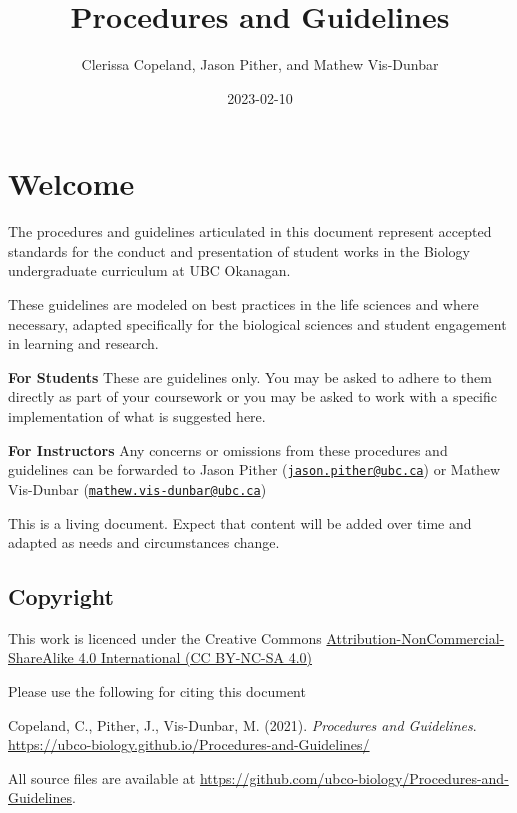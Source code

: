 \documentclass[
]{book}
\title{Procedures and Guidelines}
\author{Clerissa Copeland, Jason Pither, and Mathew Vis-Dunbar}
\date{2023-02-10}
\begin{document}
\maketitle

{
\setcounter{tocdepth}{1}
\tableofcontents
}
\hypertarget{welcome}{%
\chapter*{Welcome}\label{welcome}}

The procedures and guidelines articulated in this document represent accepted standards for the conduct and presentation of student works in the Biology undergraduate curriculum at UBC Okanagan.

These guidelines are modeled on best practices in the life sciences and where necessary, adapted specifically for the biological sciences and student engagement in learning and research.

\textbf{For Students} These are guidelines only. You may be asked to adhere to them directly as part of your coursework or you may be asked to work with a specific implementation of what is suggested here.

\textbf{For Instructors} Any concerns or omissions from these procedures and guidelines can be forwarded to Jason Pither (\href{mailto:jason.pither@ubc.ca}{\nolinkurl{jason.pither@ubc.ca}}) or Mathew Vis-Dunbar (\href{mailto:mathew.vis-dunbar@ubc.ca}{\nolinkurl{mathew.vis-dunbar@ubc.ca}})

This is a living document. Expect that content will be added over time and adapted as needs and circumstances change.

\hypertarget{copyright}{%
\section*{Copyright}\label{copyright}}

This work is licenced under the Creative Commons \href{https://creativecommons.org/licenses/by-nc-sa/4.0/}{Attribution-NonCommercial-ShareAlike 4.0 International (CC BY-NC-SA 4.0)}

Please use the following for citing this document

Copeland, C., Pither, J., Vis-Dunbar, M. (2021). \emph{Procedures and Guidelines}. \url{https://ubco-biology.github.io/Procedures-and-Guidelines/}

All source files are available at \url{https://github.com/ubco-biology/Procedures-and-Guidelines}.
\end{document}

